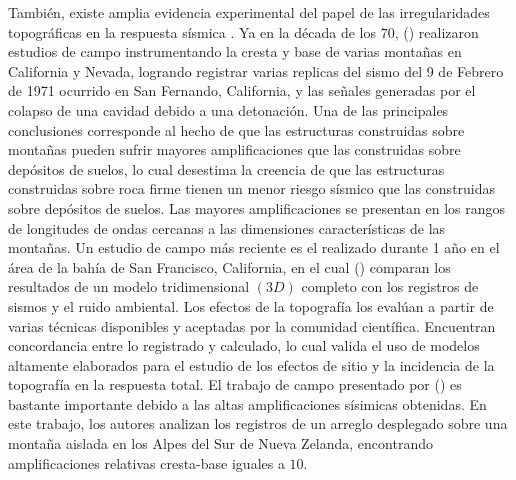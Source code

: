 \documentclass[spanish,letterpaper,12pt,twoside,openany]{article}
\begin{document}
También, existe amplia evidencia experimental del papel de las irregularidades topográficas en la respuesta sísmica \citep[por ejemplo,][]{Hartzell2013, Buech2010, Tucker1984, Griffiths1979, Rogers1974, Davis1973}. Ya en la década de los $70$, \citeauthor{Davis1973} (\citeyear{Davis1973}) realizaron estudios de campo instrumentando la cresta y base de varias montañas en California y Nevada, logrando registrar varias replicas del sismo del 9 de Febrero de 1971 ocurrido en San Fernando, California, y las señales generadas por el colapso de una cavidad debido a una detonación. Una de las principales conclusiones corresponde al hecho de que las estructuras construidas sobre montañas pueden sufrir mayores amplificaciones que las construidas sobre depósitos de suelos, lo cual desestima la creencia de que las estructuras construidas sobre roca firme tienen un menor riesgo sísmico que las construidas sobre depósitos de suelos. Las mayores amplificaciones se presentan en los rangos de longitudes de ondas cercanas a las dimensiones características de las montañas. Un estudio de campo más reciente es el realizado durante 1 año en el área de la bahía de San Francisco, California, en el cual \citeauthor{Hartzell2013} (\citeyear{Hartzell2013}) comparan los resultados de un modelo tridimensional $\left( 3D \right)$ completo con los registros de sismos y el ruido ambiental. Los efectos de la topografía los evalúan a partir de varias técnicas disponibles y aceptadas por la comunidad científica. Encuentran concordancia entre lo registrado y calculado, lo cual valida el uso de modelos altamente elaborados para el estudio de los efectos de sitio y la incidencia de la topografía en la respuesta total. El trabajo de campo presentado por \citeauthor{Buech2010} (\citeyear{Buech2010}) es bastante importante debido a las altas amplificaciones sísimicas obtenidas. En este trabajo, los autores analizan los registros de un arreglo desplegado sobre una montaña aislada en los Alpes del Sur de Nueva Zelanda, encontrando amplificaciones relativas cresta-base iguales a $10$.
\end{document}
